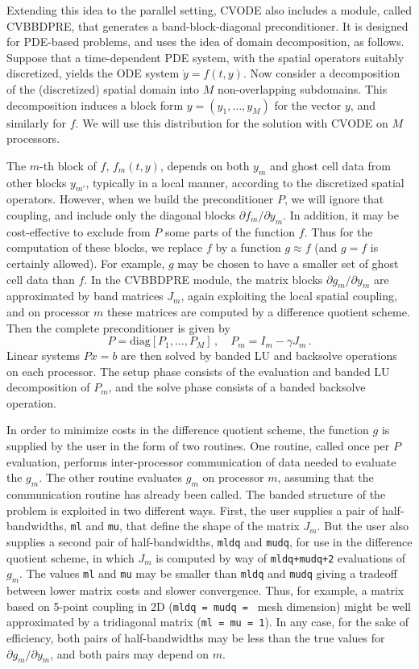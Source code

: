 Extending this idea to the parallel setting, CVODE also includes a
module, called CVBBDPRE, that generates a band-block-diagonal
preconditioner.  It is designed for PDE-based problems, and uses the
idea of domain decomposition, as follows.  Suppose that a
time-dependent PDE system, with the spatial operators suitably
discretized, yields the ODE system $\dot{y} = f(t,y)$.  Now consider a
decomposition of the (discretized) spatial domain into $M$
non-overlapping subdomains.  This decomposition induces a block form
$y = (y_1,\ldots,y_M)$ for the vector $y$, and similarly for $f$.  We
will use this distribution for the solution with CVODE on $M$
processors.

The $m$-th block of $f$, $f_m(t,y)$, depends on both $y_m$ and ghost
cell data from other blocks $y_{m'}$, typically in a local manner,
according to the discretized spatial operators.  However, when we
build the preconditioner $P$, we will ignore that coupling, and
include only the diagonal blocks $\partial f_m / \partial y_m$.  In
addition, it may be cost-effective to exclude from $P$ some parts of
the function $f$.  Thus for the computation of these blocks, we
replace $f$ by a function $g \approx f$ (and $g = f$ is certainly
allowed).  For example, $g$ may be chosen to have a smaller set of ghost
cell data than $f$.  In the CVBBDPRE module, the matrix blocks
$\partial g_m/\partial y_m$ are approximated by band matrices $J_m$,
again exploiting the local spatial coupling, and on processor $m$
these matrices
are computed by a difference quotient scheme.  Then the complete
preconditioner is given by
\begin{equation*}
  P = \mbox{diag}[P_1,\ldots,P_M] \, , \quad 
  P_m = I_m - \gamma J_m \, . 
\end{equation*}
Linear systems $Px = b$ are then solved by banded LU and backsolve
operations on each processor.  The setup phase consists of the
evaluation and banded LU decomposition of $P_m$, and the solve phase
consists of a banded backsolve operation.

In order to minimize costs in the difference quotient scheme, the
function $g$ is supplied by the user in the form of two routines.  One
routine, called once per $P$ evaluation, performs inter-processor
communication of data needed to evaluate the $g_m$.  The other routine
evaluates $g_m$ on processor $m$, assuming that the communication
routine has already been called.  The banded structure of the problem
is exploited in two different ways.  First, the user supplies a pair of
half-bandwidths, {\tt ml} and {\tt mu}, that define the shape of the
matrix $J_m$.  But the user also supplies a second pair of
half-bandwidths, {\tt mldq} and {\tt mudq}, for use in the difference
quotient scheme, in which $J_m$ is computed by way of 
{\tt mldq+mudq+2} evaluations of $g_m$.  The values {\tt ml} and {\tt mu} 
may be smaller than {\tt mldq} and {\tt mudq} giving a tradeoff between
lower matrix costs and slower convergence.  Thus, for example, a matrix 
based on 5-point coupling in
2D ({\tt mldq = mudq = } mesh dimension) might be well approximated by
a tridiagonal matrix ({\tt ml = mu = 1}).  In any case, for the sake
of efficiency, both pairs of half-bandwidths may be less than the true
values for $\partial g_m /\partial y_m$, and both pairs may depend on
$m$.

